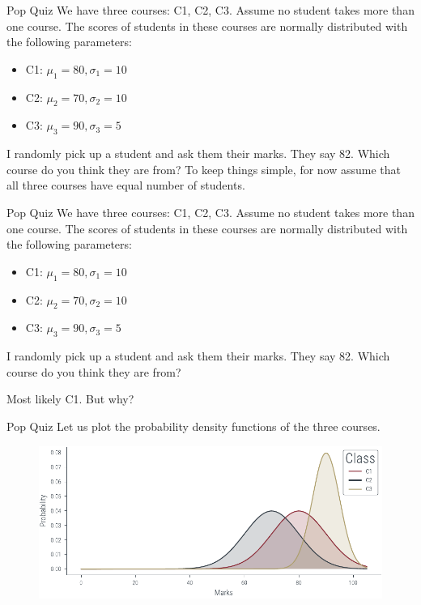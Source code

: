 \documentclass[handout]{beamer}
\begin{document}
\begin{frame}{Pop Quiz}
    We have three courses: C1, C2, C3. Assume no student takes more than one course.
    The scores of students in these courses are normally distributed with the following parameters:
    \begin{itemize}
        \item C1: $\mu_1 = 80, \sigma_1 = 10$
        \item C2: $\mu_2 = 70, \sigma_2 = 10$
        \item C3: $\mu_3 = 90, \sigma_3 = 5$
    \end{itemize}

   
    I randomly pick up a student and ask them their marks. They say 82. Which course do you think they are from?
    To keep things simple, for now assume that all three courses have equal number of students.
    
    
    
\end{frame}

\begin{frame}{Pop Quiz}
    We have three courses: C1, C2, C3. Assume no student takes more than one course.
    The scores of students in these courses are normally distributed with the following parameters:
    \begin{itemize}
        \item C1: $\mu_1 = 80, \sigma_1 = 10$
        \item C2: $\mu_2 = 70, \sigma_2 = 10$
        \item C3: $\mu_3 = 90, \sigma_3 = 5$
    \end{itemize}

   
    I randomly pick up a student and ask them their marks. They say 82. Which course do you think they are from?
    
    
    
    Most likely C1. But why?
    
\end{frame}

\begin{frame}{Pop Quiz}
    Let us plot the probability density functions of the three courses. 
    \begin{figure}
        \includegraphics[width=\textwidth]{../figures/mle/mle-example.pdf}
    \end{figure}
    
\end{frame}
\end{document}
